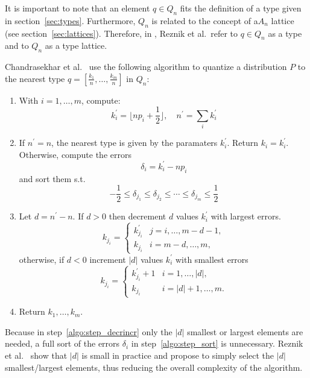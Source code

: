 It is important to note that an element $q \in Q_n$ fits the definition of a type given in section~\ref{sec:types}. Furthermore, $Q_n$ is related to the concept of a$A_n$ lattice (see section~\ref{sec:lattices}). Therefore, in \cite{fastchog}, Reznik et al.\ refer to $q \in Q_n$ as a type and to $Q_n$ as a type lattice.

Chandrasekhar et al.\ \cite{chog2011} use the following algorithm to quantize a distribution $P$ to the nearest type $q = [\frac{k_1}{n},\ldots,\frac{k_m}{n}]$ in $Q_n$:
\begin{enumerate}

\item With $i=1,\ldots,m$, compute: \begin{displaymath}
k_i^\prime = \lfloor np_i+\frac{1}{2} \rfloor,\quad n^\prime=\sum_i k_i^\prime
\end{displaymath}

\item \label{algo:step_sort} If $n^\prime = n$, the nearest type is given by the paramaters $k_i^\prime$. Return $k_i = k_i^\prime$. Otherwise, compute the errors
\begin{displaymath}
\delta_i = k_i^\prime - np_i
\end{displaymath}
 and sort them s.t.
\begin{displaymath}
-\frac{1}{2} \leq \delta_{j_1} \leq \delta_{j_2} \leq \cdots \leq \delta_{j_m} \leq \frac{1}{2}
\end{displaymath}

\item \label{algo:step_decrincr} Let $d = n^\prime - n$. If $d > 0$ then decrement $d$ values $k_i^\prime$ with largest errors.
\[
k_{j_i} = \begin{cases}
k_{j_i}^\prime & j = i,\ldots,m-d-1, \\
k_{j_i} & i=m-d,\ldots,m,
\end{cases}
\]
otherwise, if $d < 0$ increment $\left|d\right|$ values $k_i^\prime$ with smallest errors
\[
k_{j_i} = \begin{cases}
k_{j_i}^\prime + 1 & i = 1,\ldots,\left|d\right|, \\
k_{j_i} & i=\left|d\right|+1,\ldots,m.
\end{cases}
\]

\item Return $k_1,\ldots,k_m$.
\end{enumerate}

Because in step~\ref{algo:step_decrincr} only the $\left|d\right|$ smallest or largest elements are needed, a full sort of the errors $\delta_i$ in step~\ref{algo:step_sort} is unnecessary. Reznik et al.\ \cite{fastchog} show that $\left|d\right|$ is small in practice and propose to simply select the $\left|d\right|$ smallest/largest elements, thus reducing the overall complexity of the algorithm.

